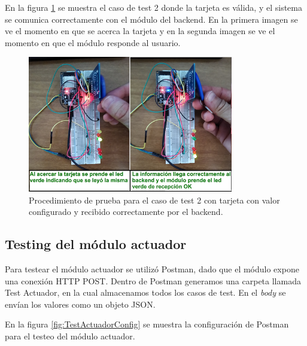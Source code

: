 En la figura \ref{fig:TestTajetaCodigoLeida} se muestra el caso de test 2 donde la tarjeta es válida, y el sistema se comunica correctamente con el módulo del backend. En la primera imagen se ve el momento en que se acerca la tarjeta y en la segunda imagen se ve el momento en que el módulo responde al usuario.


\begin{figure}[ht]
	\centering
	\includegraphics[width=0.8\textwidth]{./Figures/TestTajetaCodigoLeida.png}
	\caption{Procedimiento de prueba para el caso de test 2 con tarjeta con valor configurado y recibido correctamente por el backend.}
	\label{fig:TestTajetaCodigoLeida}
\end{figure}


\clearpage
\subsection{Testing del módulo actuador}

Para testear el módulo actuador se utilizó Postman, dado que el módulo expone una conexión HTTP POST. Dentro de Postman generamos una carpeta llamada Test Actuador, en la cual almacenamos todos los casos de test. En el \textit{body} se envían los valores como un objeto JSON.

En la figura \ref{fig:TestActuadorConfig} se muestra la configuración de Postman para el testeo del módulo actuador.

